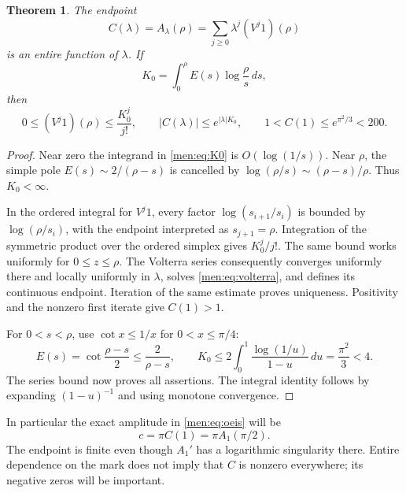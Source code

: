\documentclass[11pt,letterpaper]{article}
\newtheorem{theorem}{Theorem}[section]
\theoremstyle{remark}\newtheorem{remark}[theorem]{Remark}
\begin{document}
\begin{theorem}\label{men:thm:endpoint}
The endpoint
\[
 C(\lambda)=A_\lambda(\rho)
   =\sum_{j\ge0}\lambda^j(V^j1)(\rho)
\]
is an entire function of $\lambda$. If
\begin{equation}\label{men:eq:K0}
 K_0=\int_0^\rho E(s)\log\frac\rho s\,ds,
\end{equation}
then
\begin{equation}\label{men:eq:endbound}
 0\le(V^j1)(\rho)\le\frac{K_0^j}{j!},\qquad
 |C(\lambda)|\le e^{|\lambda|K_0},\qquad
 1<C(1)\le e^{\pi^2/3}<200.
\end{equation}
\end{theorem}
\begin{proof}
Near zero the integrand in \eqref{men:eq:K0} is $O(\log(1/s))$. Near $\rho$, the simple pole $E(s)\sim2/(\rho-s)$ is cancelled by $\log(\rho/s)\sim(\rho-s)/\rho$. Thus $K_0<\infty$.

In the ordered integral for $V^j1$, every factor $\log(s_{i+1}/s_i)$ is bounded by $\log(\rho/s_i)$, with the endpoint interpreted as $s_{j+1}=\rho$. Integration of the symmetric product over the ordered simplex gives $K_0^j/j!$. The same bound works uniformly for $0\le z\le\rho$. The Volterra series consequently converges uniformly there and locally uniformly in $\lambda$, solves \eqref{men:eq:volterra}, and defines its continuous endpoint. Iteration of the same estimate proves uniqueness. Positivity and the nonzero first iterate give $C(1)>1$.

For $0<s<\rho$, use $\cot x\le1/x$ for $0<x\le\pi/4$:
\[
 E(s)=\cot\frac{\rho-s}{2}\le\frac2{\rho-s},\qquad
 K_0\le2\int_0^1\frac{\log(1/u)}{1-u}\,du
       =\frac{\pi^2}3<4.
\]
The series bound now proves all assertions. The integral identity follows by expanding $(1-u)^{-1}$ and using monotone convergence.
\end{proof}

In particular the exact amplitude in \eqref{men:eq:oeis} will be
\begin{equation}\label{men:eq:amplitude}
 c=\pi C(1)=\pi A_1(\pi/2).
\end{equation}
The endpoint is finite even though $A_1'$ has a logarithmic singularity there. Entire dependence on the mark does not imply that $C$ is nonzero everywhere; its negative zeros will be important.
\end{document}
